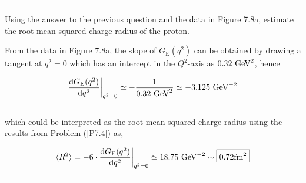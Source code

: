 \noindent\rule{7in}{1.5pt}


\begin{problem}{7.5}
    Using the answer to the previous question and the data in Figure 7.8a, estimate the root-mean-squared charge
    radius of the proton.
\end{problem}
\begin{solution}
From the data in Figure 7.8a, the slope of $G_{\text{E}}(q^2)$ can be obtained by drawing a tangent at $q^2=0$ which has an intercept in the $Q^2$-axis as $0.32 \text{ GeV}^2$, hence

\begin{align*}
    \frac{\mathop{}\!\mathrm{d} G_{\text{E}}(q^2)}{\mathop{}\!\mathrm{d} q^2} \bigg|_{\scriptsize q^2=0} \simeq - \frac{1}{0.32 \text{ GeV}^2} \simeq -3.125 \text{ GeV}^{-2}
\end{align*}\\
which could be interpreted as the root-mean-squared charge radius using the results from Problem (\ref{P7.4}) as,

\begin{align*}
    \langle R^2 \rangle = -6 \cdot \frac{\mathop{}\!\mathrm{d} G_{\text{E}}(q^2)}{\mathop{}\!\mathrm{d} q^2} \bigg|_{\scriptsize q^2=0} \simeq 18.75 \text{ GeV}^{-2} \sim\boxed{ 0.72 \text{fm}^2}
\end{align*}
\end{solution}

\noindent\rule{7in}{1.5pt}


